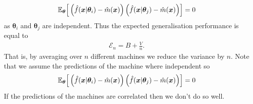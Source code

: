 \documentclass{sotonExamBoxes}    %
\newcommand{\bra}[1]{\left(#1\right)}
\newcommand{\av}[2][\,]{\mathbb{E}_{#1}\!\left[ {\strut #2} \right]}
\begin{document}
\begin{question}{20}
\begin{qparts}
\begin{answer}
\begin{align*}
         \av[\bm{\theta}]{\bra{\ml{i}-\mm}\bra{\ml{j}-\mm }} = 0
      \end{align*}
      as $\bm{\theta}_i$ and $\bm{\theta}_j$ are independent.  Thus the expected
      generalisation performance is equal to
      \begin{align*}
        \mathcal{E}_n = B + \frac{V}{n}.
      \end{align*}
      That is, by averaging over $n$ different machines we reduce the
      variance by $n$.  Note that we assume the predictions of the
      machine where independent so
      \begin{align*}
        \av[\bm{\theta}]{\bra{\ml{i}-\mm}\bra{\ml{j}-\mm }} = 0
      \end{align*}
      If the predictions of the machines are correlated then we don't
      do so well.
     \end{answer}
   \end{qparts}
\end{question}
\end{document}
